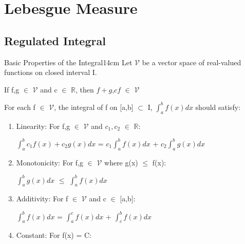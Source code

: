 \newpage

\section[Day 17: Lebesgue Measure]{ Lebesgue Measure }

\subsection{ Regulated Integral }

    \begin{definition}{Basic Properties of the Integral}{14cm}
        Let $\mathcal{V}$ be a vector space of real-valued functions
        on closed interval I.

        \hspace{0.5cm}
        If f,g $\in$ $\mathcal{V}$ and c $\in$ $\mathbb{R}$,
        then $f+g$,$cf$ $\in$ $\mathcal{V}$

        For each f $\in$ $\mathcal{V}$,
        the integral of f on [a,b] $\subset$ I, $\int_a^b f(x) dx$
        should satisfy:

        \begin{enumerate}[label=(\alph*), leftmargin=1cm, itemsep=0.1cm]
            \item {\color{lblue} Linearity}:
                For f,g $\in$ $\mathcal{V}$ and $c_1,c_2$ $\in$ $\mathbb{R}$:
            
                \hspace{0.5cm}
                $\int_a^b c_1f(x) + c_2g(x) dx$
                = $c_1 \int_a^b f(x) dx$ + $c_2 \int_a^b g(x) dx$

            \item {\color{lblue} Monotonicity}:
                For f,g $\in$ $\mathcal{V}$ where g(x) $\leq$ f(x):
            
                \hspace{0.5cm}
                $\int_a^b g(x) dx$ $\leq$ $\int_a^b f(x) dx$

            \item {\color{lblue} Additivity}:
                For f $\in$ $\mathcal{V}$ and c $\in$ [a,b]:
            
                \hspace{0.5cm}
                $\int_a^b f(x) dx$
                = $\int_a^c f(x) dx$ + $\int_c^b f(x) dx$

            \item {\color{lblue} Constant}:
                For f(x) = C:
            

\end{enumerate}
\end{definition}
